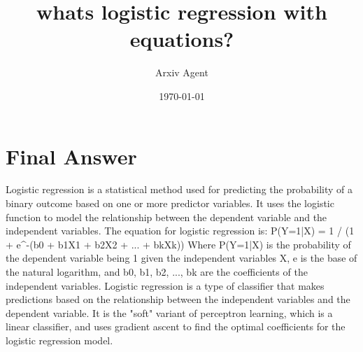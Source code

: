 \documentclass{article}%
\title{whats logistic regression with equations?}%
\author{Arxiv Agent}%
\date{\today}%
\begin{document}
%
\normalsize%
\maketitle%
\section{Final Answer}%
\label{sec:FinalAnswer}%
Logistic regression is a statistical method used for predicting the probability of a binary outcome based on one or more predictor variables. It uses the logistic function to model the relationship between the dependent variable and the independent variables. The equation for logistic regression is:\newline%
\newline%
P(Y=1|X) = 1 / (1 + e\^{}{-}(b0 + b1X1 + b2X2 + ... + bkXk))\newline%
\newline%
Where P(Y=1|X) is the probability of the dependent variable being 1 given the independent variables X, e is the base of the natural logarithm, and b0, b1, b2, ..., bk are the coefficients of the independent variables. Logistic regression is a type of classifier that makes predictions based on the relationship between the independent variables and the dependent variable. It is the "soft" variant of perceptron learning, which is a linear classifier, and uses gradient ascent to find the optimal coefficients for the logistic regression model.

%
\end{document}
